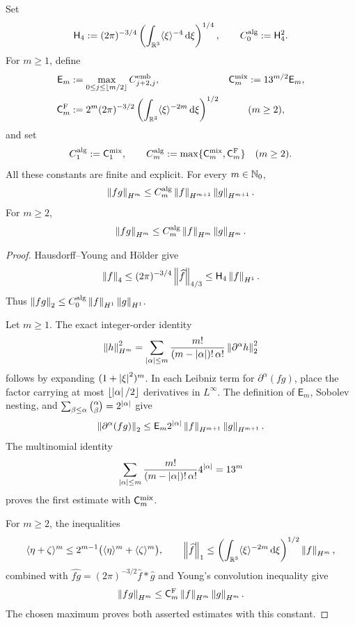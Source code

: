 \begin{lemma}
\label{f:lem:sobolev-product}
Set
\[
 \mathsf H_4:=(2\pi)^{-3/4}
 \left(\int_{\mathbb R^3}\langle\xi\rangle^{-4}\,\mathrm d\xi\right)^{1/4},
 \qquad C_0^{\rm alg}:=\mathsf H_4^2.
\]
For \(m\ge1\), define
\begin{align*}
 \mathsf E_m
 &:=\max_{0\le j\le\lfloor m/2\rfloor}C_{j+2,j}^{\rm emb},
 &\mathsf C_m^{\rm mix}&:=13^{m/2}\mathsf E_m,\\
 \mathsf C_m^{\rm F}
 &:=2^m(2\pi)^{-3/2}
 \left(\int_{\mathbb R^3}\langle\xi\rangle^{-2m}\,\mathrm d\xi\right)^{1/2}
 &&(m\ge2),
\end{align*}
and set
\[
 C_1^{\rm alg}:=\mathsf C_1^{\rm mix},
 \qquad
 C_m^{\rm alg}:=\max\{\mathsf C_m^{\rm mix},\mathsf C_m^{\rm F}\}
 \quad(m\ge2).
\]
All these constants are finite and explicit.  For every \(m\in\mathbb N_0\),
\[
 \left\lVert fg\right\rVert_{H^m}
 \le C_m^{\rm alg}\left\lVert f\right\rVert_{H^{m+1}}\left\lVert g\right\rVert_{H^{m+1}}.
\]
For \(m\ge2\),
\[
 \left\lVert fg\right\rVert_{H^m}
 \le C_m^{\rm alg}\left\lVert f\right\rVert_{H^m}\left\lVert g\right\rVert_{H^m}.
\]
\end{lemma}

\begin{proof}
Hausdorff--Young and H\"older give
\[
 \left\lVert f\right\rVert_4
 \le(2\pi)^{-3/4}\left\lVert \widehat f\right\rVert_{4/3}
 \le\mathsf H_4\left\lVert f\right\rVert_{H^1}.
\]
Thus \(\left\lVert fg\right\rVert_2\le C_0^{\rm alg}\left\lVert f\right\rVert_{H^1}\left\lVert g\right\rVert_{H^1}\).

Let \(m\ge1\).  The exact integer-order identity
\[
 \left\lVert h\right\rVert_{H^m}^2
 =\sum_{\left|\alpha\right|\le m}
 \frac{m!}{(m-\left|\alpha\right|)!\,\alpha!}
 \left\lVert \partial^\alpha h\right\rVert_2^2
\]
follows by expanding \((1+\left|\xi\right|^2)^m\).  In each Leibniz term for
\(\partial^\alpha(fg)\), place the factor carrying at most
\(\lfloor\left|\alpha\right|/2\rfloor\) derivatives in \(L^\infty\).  The definition
of \(\mathsf E_m\), Sobolev nesting, and
\(\sum_{\beta\le\alpha}\binom\alpha\beta=2^{\left|\alpha\right|}\) give
\[
 \left\lVert \partial^\alpha(fg)\right\rVert_2
 \le \mathsf E_m2^{\left|\alpha\right|}
 \left\lVert f\right\rVert_{H^{m+1}}\left\lVert g\right\rVert_{H^{m+1}}.
\]
The multinomial identity
\[
 \sum_{\left|\alpha\right|\le m}
 \frac{m!}{(m-\left|\alpha\right|)!\,\alpha!}4^{\left|\alpha\right|}=13^m
\]
proves the first estimate with \(\mathsf C_m^{\rm mix}\).

For \(m\ge2\), the inequalities
\[
 \langle\eta+\zeta\rangle^m
 \le2^{m-1}\bigl(\langle\eta\rangle^m+
                         \langle\zeta\rangle^m\bigr),
 \qquad
 \left\lVert \widehat f\right\rVert_1
 \le\left(\int_{\mathbb R^3}\langle\xi\rangle^{-2m}\,\mathrm d\xi\right)^{1/2}
       \left\lVert f\right\rVert_{H^m},
\]
combined with \(\widehat{fg}=(2\pi)^{-3/2}\widehat f*\widehat g\)
and Young's convolution inequality give
\[
 \left\lVert fg\right\rVert_{H^m}
 \le\mathsf C_m^{\rm F}\left\lVert f\right\rVert_{H^m}\left\lVert g\right\rVert_{H^m}.
\]
The chosen maximum proves both asserted estimates with this constant.
\end{proof}

